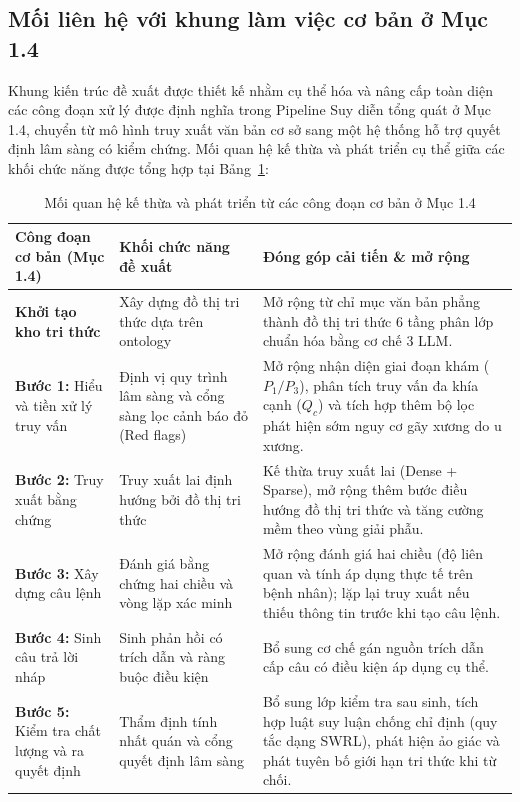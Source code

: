 \subsection{Mối liên hệ với khung làm việc cơ bản ở Mục 1.4}
Khung kiến trúc đề xuất được thiết kế nhằm cụ thể hóa và nâng cấp toàn diện các công đoạn xử lý được định nghĩa trong Pipeline Suy diễn tổng quát ở Mục 1.4, chuyển từ mô hình truy xuất văn bản cơ sở sang một hệ thống hỗ trợ quyết định lâm sàng có kiểm chứng. Mối quan hệ kế thừa và phát triển cụ thể giữa các khối chức năng được tổng hợp tại Bảng~\ref{tab:mapping_pipeline}:

\begin{table}[h!]
\centering
\small
\begin{tabularx}{\textwidth}{|>{\raggedright\arraybackslash}p{4cm}|>{\raggedright\arraybackslash}p{4.2cm}|>{\raggedright\arraybackslash}X|}
\hline
\textbf{Công đoạn cơ bản (Mục 1.4)} & \textbf{Khối chức năng đề xuất} & \textbf{Đóng góp cải tiến \& mở rộng} \\
\hline
\textbf{Khởi tạo kho tri thức} & Xây dựng đồ thị tri thức dựa trên ontology & Mở rộng từ chỉ mục văn bản phẳng thành đồ thị tri thức 6 tầng phân lớp chuẩn hóa bằng cơ chế 3 LLM. \\
\hline
\textbf{Bước 1:} Hiểu và tiền xử lý truy vấn & Định vị quy trình lâm sàng và cổng sàng lọc cảnh báo đỏ (Red flags) & Mở rộng nhận diện giai đoạn khám ($P_1 / P_3$), phân tích truy vấn đa khía cạnh ($Q_c$) và tích hợp thêm bộ lọc phát hiện sớm nguy cơ gãy xương do u xương. \\
\hline
\textbf{Bước 2:} Truy xuất bằng chứng & Truy xuất lai định hướng bởi đồ thị tri thức & Kế thừa truy xuất lai (Dense + Sparse), mở rộng thêm bước điều hướng đồ thị tri thức và tăng cường mềm theo vùng giải phẫu. \\
\hline
\textbf{Bước 3:} Xây dựng câu lệnh & Đánh giá bằng chứng hai chiều và vòng lặp xác minh & Mở rộng đánh giá hai chiều (độ liên quan và tính áp dụng thực tế trên bệnh nhân); lặp lại truy xuất nếu thiếu thông tin trước khi tạo câu lệnh. \\
\hline
\textbf{Bước 4:} Sinh câu trả lời nháp & Sinh phản hồi có trích dẫn và ràng buộc điều kiện & Bổ sung cơ chế gán nguồn trích dẫn cấp câu có điều kiện áp dụng cụ thể. \\
\hline
\textbf{Bước 5:} Kiểm tra chất lượng và ra quyết định & Thẩm định tính nhất quán và cổng quyết định lâm sàng & Bổ sung lớp kiểm tra sau sinh, tích hợp luật suy luận chống chỉ định (quy tắc dạng SWRL), phát hiện ảo giác và phát tuyên bố giới hạn tri thức khi từ chối. \\
\hline
\end{tabularx}
\caption{Mối quan hệ kế thừa và phát triển từ các công đoạn cơ bản ở Mục 1.4}
\label{tab:mapping_pipeline}
\end{table}

